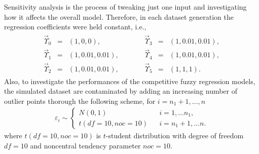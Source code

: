 \documentclass{IJFS}
\begin{document}
Sensitivity analysis is the process of tweaking just one input and investigating how it affects the overall model.
Therefore, in each dataset generation the regression coefficients were held constant, i.e.,
\begin{eqnarray*}
\begin{array}{cclcccl}
\vec{\Upsilon}_0& = & (1,   0,   0), &\qquad&\vec{\Upsilon}_3 & = & (1,0.01,0.01),\\
\vec{\Upsilon}_1& = & (1,0.01,0.01), &\qquad&\vec{\Upsilon}_4 & = & (1,0.01,0.01), \\
\vec{\Upsilon}_2& = & (1,0.01,0.01), &\qquad&\vec{\Upsilon}_5 & = & (1,   1,   1).
\end{array}
\end{eqnarray*}
Also, to investigate the performances of the competitive fuzzy regression models, the simulated dataset are contaminated
by adding an increasing number of outlier points %
thorough the following scheme, for $i=n_1+1,\ldots,n$
\begin{eqnarray*}
\varepsilon_i         \sim   \left\{
\begin{array}{lcl}
N(0,1)   &  & i=1,\ldots n_1,\\
t(df=10, noc=10) &  & i=n_1+1,\ldots n.
\end{array}
\right.
\end{eqnarray*}
where $t(df=10, noc=10)$ is $t$-student distribution with degree of freedom $df=10$ and noncentral tendency parameter $noc=10$.
\end{document}

